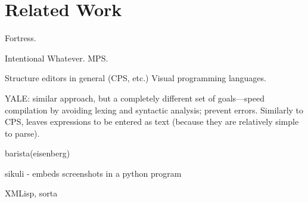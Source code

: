 \chapter{Related Work}
\todo{}

Fortress. 

Intentional Whatever. MPS. 

Structure editors in general (CPS, etc.) Visual programming languages. 

YALE\cite{zavodnik}: similar approach, but a completely different set of goals---speed compilation by avoiding lexing and syntactic analysis; prevent errors. Similarly to CPS, leaves expressions to be entered as text (because they are relatively simple to parse).

barista(eisenberg)

sikuli - embeds screenshots in a python program

XMLisp, sorta

















